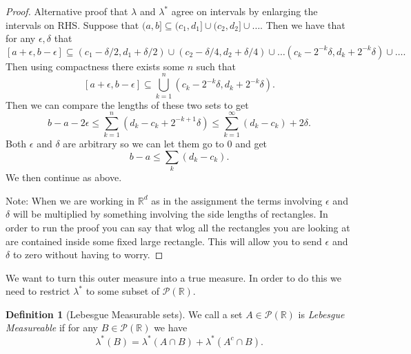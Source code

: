\documentclass[11pt]{article}
\theoremstyle{definition}
\newtheorem{dfn}[thm]{Definition}
\theoremstyle{remark}
\begin{document}
\begin{proof}
Alternative proof that $\lambda$ and $\lambda^*$ agree on intervals by enlarging the intervals on RHS. Suppose that $(a,b] \subseteq (c_1,d_1] \cup (c_2, d_2] \cup \dots$.  Then we have that for any $\epsilon, \delta$ that 
\[ [a+\epsilon, b-\epsilon] \subseteq (c_1-\delta/2, d_1 + \delta/2) \cup (c_2 - \delta/4, d_2 + \delta/4) \cup \dots (c_k -2^{-k} \delta, d_k + 2^{-k} \delta) \cup \dots.  \] Then using compactness there exists some $n$ such that
\[ [a+\epsilon, b-\epsilon] \subseteq \bigcup_{k=1}^n (c_k -2^{-k}\delta, d_k + 2^{-k} \delta). \] Then we can compare the lengths of these two sets to get
\[ b-a - 2\epsilon \leq \sum_{k=1}^n (d_k - c_k + 2^{-k+1} \delta) \leq \sum_{k=1}^\infty (d_k-c_k) + 2 \delta. \] Both $\epsilon$ and $\delta$ are arbitrary so we can let them go to $0$ and get
\[ b-a \leq \sum_k (d_k - c_k). \] We then continue as above.

Note: When we are working in $\mathbb{R}^d$ as in the assignment the terms involving $\epsilon$ and $\delta$ will be multiplied by something involving the side lengths of rectangles. In order to run the proof you can say that wlog all the rectangles you are looking at are contained inside some fixed large rectangle. This will allow you to send $\epsilon$ and $\delta$ to zero without having to worry.
\end{proof}


We want to turn this outer measure into a true measure. In order to do this we need to restrict $\lambda^*$ to some subset of $\mathscr{P}(\mathbb{R})$.
\begin{dfn}[Lebesgue Measurable sets]
We call a set $A \in \mathscr{P}(\mathbb{R})$ is \emph{Lebesgue Measureable} if for any $B \in \mathscr{P}(\mathbb{R})$ we have \[ \lambda^*(B) = \lambda^*(A \cap B) + \lambda^*(A^c \cap B). \]
\end{dfn}
\end{document}
